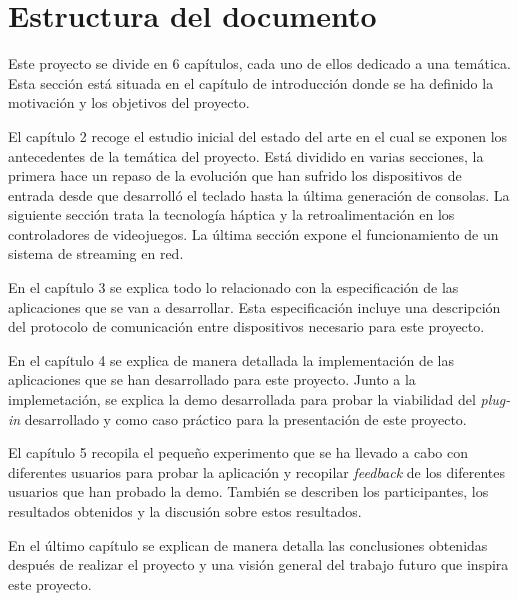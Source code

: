 \section{Estructura del documento}

Este proyecto se divide en 6 cap\'itulos, cada uno de ellos dedicado a una tem\'atica. Esta secci\'on est\'a situada en el cap\'itulo de introducci\'on donde se ha definido la motivaci\'on y los objetivos del proyecto.

El cap\'itulo 2 recoge el estudio inicial del estado del arte en el cual se exponen los antecedentes de la tem\'atica del proyecto. Est\'a dividido en varias secciones, la primera hace un repaso de la evoluci\'on que han sufrido los dispositivos de entrada desde que desarroll\'o el teclado hasta la \'ultima generaci\'on de consolas. La siguiente secci\'on trata la tecnolog\'ia h\'aptica y la retroalimentaci\'on en los controladores de videojuegos. La \'ultima secci\'on expone el funcionamiento de un sistema de streaming en red.

En el cap\'itulo 3 se explica todo lo relacionado con la especificaci\'on de las aplicaciones que se van a desarrollar. Esta especificaci\'on incluye una descripci\'on del protocolo de comunicaci\'on entre dispositivos necesario para este proyecto.

En el cap\'itulo 4 se explica de manera detallada la implementaci\'on de las aplicaciones que se han desarrollado para este proyecto. Junto a la implemetaci\'on, se explica la demo desarrollada para probar la viabilidad del \textit{plug-in} desarrollado y como caso pr\'actico para la presentaci\'on de este proyecto. 

El cap\'itulo 5 recopila el peque\~no experimento que se ha llevado a cabo con diferentes usuarios para probar la aplicaci\'on y recopilar \textit{feedback} de los diferentes usuarios que han probado la demo. Tambi\'en se describen los participantes, los resultados obtenidos y la discusi\'on sobre estos resultados.

En el \'ultimo cap\'itulo se explican de manera detalla las conclusiones obtenidas despu\'es de realizar el proyecto y una visi\'on general del trabajo futuro que inspira este proyecto.





